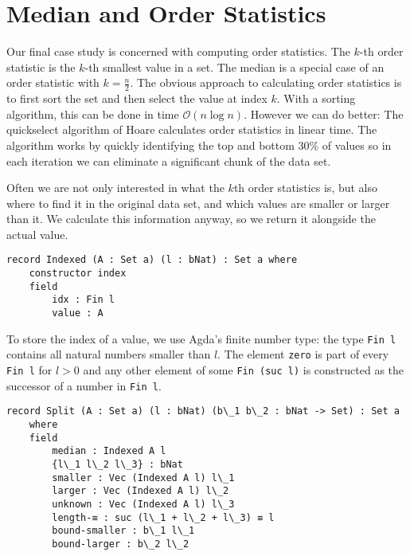 
\section{Median and Order Statistics}
\label{sec:median}
Our final case study is concerned with computing order statistics. The $k$-th order statistic is the $k$-th smallest value in a set. The median is a special case of an order statistic with $k = \frac n 2$. The obvious approach to calculating order statistics is to first sort the set and then select the value at index $k$. With a sorting algorithm, this can be done in time $\mathcal O(n \log n)$. However we can do better: The quickselect algorithm of Hoare \cite{hoare:1961:quickselect} calculates order statistics in linear time. The algorithm works by quickly identifying the top and bottom 30\% of values so in each iteration we can eliminate a significant chunk of the data set.

Often we are not only interested in what the $k$th order statistics is, but also where to find it in the original data set, and which values are smaller or larger than it. We calculate this information anyway, so we return it alongside the actual value.

\noindent\begin{minipage}{\linewidth}
\begin{lstlisting}[caption={The Indexed type},label={lst:median:indexed},emph={Indexed,index}]
record Indexed (A : Set a) (l : bNat) : Set a where
    constructor index
    field
        idx : Fin l
        value : A
\end{lstlisting}
\end{minipage}

To store the index of a value, we use Agda's finite number type: the type \texttt{Fin l} contains all natural numbers smaller than $l$. The element \texttt{zero} is part of every \texttt{Fin l}  for $l > 0$ and any other element of some \texttt{Fin (suc l)} is constructed as the successor of a number in \texttt{Fin l}.

\begin{lstlisting}[caption={The Split type},label={lst:median:split},emph={Split,Indexed}]
record Split (A : Set a) (l : bNat) (b\_1 b\_2 : bNat -> Set) : Set a
    where
    field
        median : Indexed A l
        {l\_1 l\_2 l\_3} : bNat
        smaller : Vec (Indexed A l) l\_1
        larger : Vec (Indexed A l) l\_2
        unknown : Vec (Indexed A l) l\_3
        length-≡ : suc (l\_1 + l\_2 + l\_3) ≡ l
        bound-smaller : b\_1 l\_1
        bound-larger : b\_2 l\_2
\end{lstlisting}

